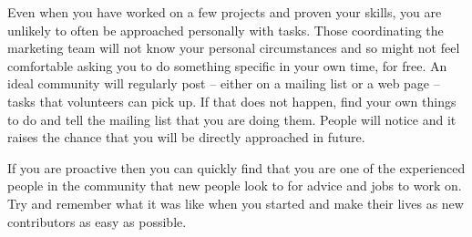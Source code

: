 Even when you have worked on a few projects and proven your skills, you are unlikely to often be approached personally with tasks. Those coordinating the marketing team will not know your personal circumstances and so might not feel comfortable asking you to do something specific in your own time, for free. An ideal community will regularly post -- either on a mailing list or a web page -- tasks that volunteers can pick up. If that does not happen, find your own things to do and tell the mailing list that you are doing them. People will notice and it raises the chance that you will be directly approached in future.

If you are proactive then you can quickly find that you are one of the experienced people in the community that new people look to for advice and jobs to work on. Try and remember what it was like when you started and make their lives as new contributors as easy as possible.
